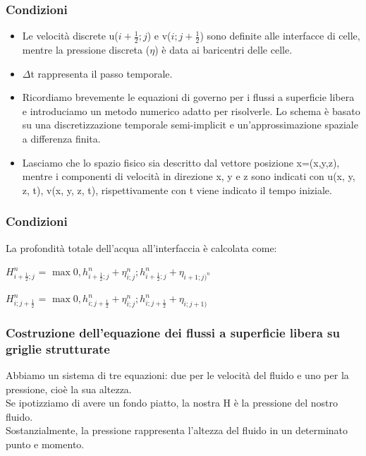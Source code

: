 \documentclass{beamer}
\begin{document}
	\begin{frame}
		
		\frametitle{Condizioni}
		
			\begin{itemize}
				\item Le velocità discrete u($i+\frac{1}{2} ; j $) e v($ i ; j+\frac{1}{2}$) sono definite alle interfacce di celle, mentre la pressione discreta ($\eta$) è data ai baricentri delle celle.\\
				\item $\Delta$t rappresenta il passo temporale.
				\smallskip
				
				\item Ricordiamo brevemente le equazioni di governo per i flussi a superficie libera e introduciamo un metodo numerico adatto per risolverle. Lo schema è basato su una discretizzazione temporale semi-implicit e un’approssimazione spaziale a differenza finita.
				\item Lasciamo che lo spazio fisico sia descritto dal vettore posizione x=(x,y,z), mentre i componenti di velocità in direzione x, y e z sono indicati con u(x, y, z, t), v(x, y, z, t), rispettivamente con t viene indicato  il tempo iniziale.
			\end{itemize}
		
	\end{frame}
	
	
	\begin{frame}
		\frametitle{Condizioni}
			La profondità totale dell'acqua all'interfaccia è calcolata come: 
	
		\begin{center}
			$ H_{i+\frac{1}{2};j}^{n} $ = $  \max { 0, h_{i + \frac{1}{2}; j}^{n} + \eta_{i;j}^{n} ; h_{i+\frac{1}{2}; j}^{n} + \eta_{i+1;j)^{n} } } $
			
			$ H_{i; j+\frac{1}{2}}^{n} $ = $ \max { 0 , h_{i; j+\frac{1}{2}}^{n} + \eta_{i;j}^{n}; h_{i; j+\frac{1}{2}}^{n}+ \eta_{i; j+1)} } $
		\end{center}
	
			
	\end{frame}
	
	\begin{frame}
		\frametitle{Costruzione dell'equazione dei flussi a superficie libera su griglie strutturate }
			Abbiamo un sistema di tre equazioni: due per le velocità del fluido e uno per la pressione, cioè la sua altezza.\\
			Se ipotizziamo di avere un fondo piatto, la nostra H è la pressione del nostro fluido.\\
			Sostanzialmente, la pressione rappresenta l’altezza del fluido in un determinato punto e momento.
			
	\end{frame}
\end{document}

